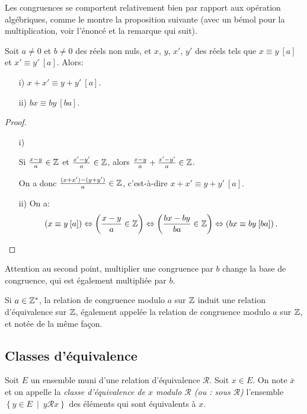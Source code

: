 Les congruences se comportent relativement bien par rapport aux opération algébriques, comme le montre la proposition suivante (avec un bémol pour la multiplication, voir l'énoncé et la remarque qui suit).

\begin{proposition} Soit $a\neq 0$ et $b\neq 0$ des réels non nuls, et $x$, $y$, $x'$, $y'$ des réels tels que $x \equiv y\: [a]$ et $x' \equiv y'\: [a]$. Alors:
\begin{itemize}
\item[i)]{$x+x' \equiv y+y'\: [a]$.}
\item[ii)]{$bx\equiv by \: [ba]$.}
\end{itemize}
\end{proposition}
\begin{proof}
\begin{itemize}
\item[i)]{Si $\frac{x-y}{a} \in \mathbb{Z}$ et $\frac{x'-y'}{a} \in \mathbb{Z}$, alors $\frac{x-y}{a}+\frac{x'-y'}{a} \in \mathbb{Z}$.

On a donc $\frac{(x+x')-(y+y')}{a} \in \mathbb{Z}$, c'est-à-dire $x+x' \equiv y+y'\: [a]$.}
\item[ii)]{On a:
\[\left(x\equiv y \: [a]\right) \Leftrightarrow  \left(\frac{x-y}{a} \in \mathbb{Z}\right) \Leftrightarrow \left(\frac{bx-by}{ba} \in \mathbb{Z}\right) \Leftrightarrow \left(bx\equiv by \: [ba]\right).\]}
\end{itemize}
\end{proof}

\begin{remarque}
Attention au second point, multiplier une congruence par $b$ change la base de congruence, qui est également multipliée par $b$.
\end{remarque}

\begin{definition}
Si $a\in \mathbb{Z}^*$, la relation de congruence modulo $a$ sur $\mathbb{Z}$ induit une relation d'équivalence sur $\mathbb{Z}$, également appelée la relation de congruence modulo $a$ sur $\mathbb{Z}$, et notée de la même façon.
\end{definition}

\subsection{Classes d'équivalence}
\begin{definition}
Soit $E$ un ensemble muni d'une relation d'équivalence ${\mathcal R}$. Soit $x\in E$. On note $\overline{x}$ et on appelle la \emph{classe d'équivalence de $x$ modulo $\mathcal R$ (ou : sous $\mathcal R$)} l'ensemble $\left\{y\in E\:\mid\: y{\mathcal R}x\right\}$ des éléments qui sont équivalents à $x$.
\end{definition}


